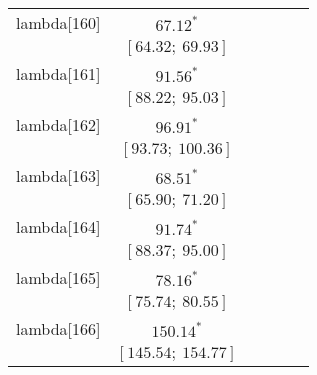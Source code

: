 \begin{table}
\begin{center}
\begin{tabular}{l c c c c c }
lambda[160] & $67.12^{*}$                      &                           &                           &                         &                         \\
            & $[64.32;\ 69.93]$                &                           &                           &                         &                         \\
lambda[161] & $91.56^{*}$                      &                           &                           &                         &                         \\
            & $[88.22;\ 95.03]$                &                           &                           &                         &                         \\
lambda[162] & $96.91^{*}$                      &                           &                           &                         &                         \\
            & $[93.73;\ 100.36]$               &                           &                           &                         &                         \\
lambda[163] & $68.51^{*}$                      &                           &                           &                         &                         \\
            & $[65.90;\ 71.20]$                &                           &                           &                         &                         \\
lambda[164] & $91.74^{*}$                      &                           &                           &                         &                         \\
            & $[88.37;\ 95.00]$                &                           &                           &                         &                         \\
lambda[165] & $78.16^{*}$                      &                           &                           &                         &                         \\
            & $[75.74;\ 80.55]$                &                           &                           &                         &                         \\
lambda[166] & $150.14^{*}$                     &                           &                           &                         &                         \\
            & $[145.54;\ 154.77]$              &                           &                           &                         &                         \\

\end{tabular}
\end{center}
\end{table}
